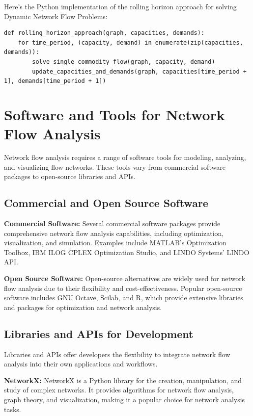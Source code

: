 \documentclass[12pt]{book} %
\begin{document}
Here's the Python implementation of the rolling horizon approach for solving Dynamic Network Flow Problems:
\FloatBarrier
\begin{lstlisting}
def rolling_horizon_approach(graph, capacities, demands):
    for time_period, (capacity, demand) in enumerate(zip(capacities, demands)):
        solve_single_commodity_flow(graph, capacity, demand)
        update_capacities_and_demands(graph, capacities[time_period + 1], demands[time_period + 1])
\end{lstlisting}
\FloatBarrier

\section{Software and Tools for Network Flow Analysis}

Network flow analysis requires a range of software tools for modeling, analyzing, and visualizing flow networks. These tools vary from commercial software packages to open-source libraries and APIs.

\subsection{Commercial and Open Source Software}

\textbf{Commercial Software:} Several commercial software packages provide comprehensive network flow analysis capabilities, including optimization, visualization, and simulation. Examples include MATLAB's Optimization Toolbox, IBM ILOG CPLEX Optimization Studio, and LINDO Systems' LINDO API.

\textbf{Open Source Software:} Open-source alternatives are widely used for network flow analysis due to their flexibility and cost-effectiveness. Popular open-source software includes GNU Octave, Scilab, and R, which provide extensive libraries and packages for optimization and network analysis.

\subsection{Libraries and APIs for Development}

Libraries and APIs offer developers the flexibility to integrate network flow analysis into their own applications and workflows.

\textbf{NetworkX:} NetworkX is a Python library for the creation, manipulation, and study of complex networks. It provides algorithms for network flow analysis, graph theory, and visualization, making it a popular choice for network analysis tasks.
\end{document}
